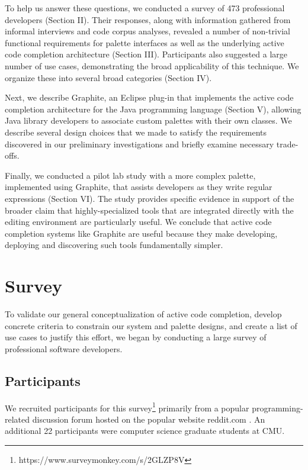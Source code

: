 \documentclass[10pt, conference, compsocconf]{IEEEtran}
\begin{document}
To help us answer these questions, we conducted a survey of 473 professional developers (Section II). Their responses, along with information gathered from informal interviews and code corpus analyses, revealed a number of non-trivial functional requirements for palette interfaces as well as the underlying active code completion architecture (Section III). Participants also suggested a large number of use cases, demonstrating the broad applicability of this technique. We organize these into several broad categories (Section IV). 

Next, we describe Graphite, an Eclipse plug-in that implements the active code completion architecture for the Java programming language (Section V), allowing Java library developers to associate custom palettes with their own classes. We describe several design choices that we made to satisfy the requirements discovered in our preliminary investigations and briefly examine necessary trade-offs.

Finally, we conducted a pilot lab study with a more complex palette, implemented using Graphite, that assists developers as they write regular expressions (Section VI). The study provides specific evidence in support of the broader claim that highly-specialized tools that are integrated directly with the editing environment are particularly useful. We conclude that active code completion systems like Graphite are useful because they make developing, deploying and discovering such tools fundamentally simpler.

\section{Survey}
To validate our general conceptualization of active code completion, develop concrete criteria to constrain our system and palette designs, and create a list of use cases to justify this effort, we began by conducting a large survey of professional software developers.

\subsection{Participants}
We recruited participants for this survey\footnote{https://www.surveymonkey.com/s/2GLZP8V} primarily from a popular programming-related discussion forum hosted on the popular website reddit.com \cite{reddit_programming}. An additional 22 participants were computer science graduate students at CMU. 
\end{document}
